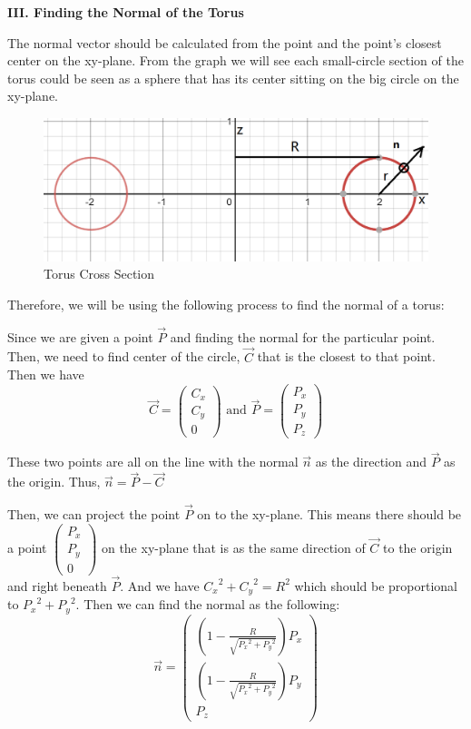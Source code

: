 \documentclass[a4paper,12pt]{report}
\begin{document}
\textbf{III. Finding the Normal of the Torus}

The normal vector should be calculated from the point and the point's closest center on the xy-plane. From the graph we will see each small-circle section of the torus could be seen as a sphere that has its center sitting on the big circle on the xy-plane. 
\begin{figure}[h]
\centering
\includegraphics[scale=0.75]{./Pic/Torus5.png}
\caption{Torus Cross Section}
\end{figure}
Therefore, we will be using the following process to find the normal of a torus:

Since we are given a point $\overrightarrow{P}$ and finding the normal for the particular point. Then, we need to find center of the circle, $\overrightarrow{C}$ that is the closest to that point. Then we have  \[\overrightarrow{C}=\begin{pmatrix}
C_x\\
C_y\\
0
\end{pmatrix}\text{ and }\overrightarrow{P}=\begin{pmatrix}
P_x\\
P_y\\
P_z
\end{pmatrix}\]

These two points are all on the line with the normal $\overrightarrow{n}$ as the direction and $\overrightarrow{P}$ as the origin. Thus, $\overrightarrow{n}=\overrightarrow{P}-\overrightarrow{C}$

Then, we can project the point $\overrightarrow{P}$ on to the xy-plane. This means there should be a point $\begin{pmatrix}
P_x\\
P_y\\
0
\end{pmatrix}$ on the xy-plane that is as the same direction of $\overrightarrow{C}$ to the origin and right beneath $\overrightarrow{P}$. And we have ${C_x}^2+{C_y}^2=R^2$ which should be proportional to ${P_x}^2+{P_y}^2$. Then we can find the normal as the following:
\[\overrightarrow{n}=\begin{pmatrix}
(1-\frac{R}{\sqrt{{P_x}^2+{P_y}^2}})P_x\\
(1-\frac{R}{\sqrt{{P_x}^2+{P_y}^2}})P_y\\
P_z
\end{pmatrix}\]
\end{document}
